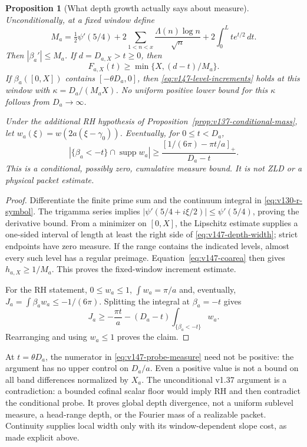\documentclass[11pt]{article}
\newtheorem{proposition}[theorem]{Proposition}
\theoremstyle{remark}
\begin{document}
\begin{proposition}[What depth growth actually says about measure]
\label{prop:v147-depth-measure}
Unconditionally, at a fixed window define
\[
 M_a=\tfrac12\psi'(5/4)
       +2\sum_{1<n<x}\frac{\Lambda(n)\log n}{\sqrt n}
       +2\int_0^L t e^{t/2}\,dt.
\]
Then $|\beta_a'|\le M_a$. If $d=D_{a,X}>t\ge0$, then
\begin{equation}\label{eq:v147-depth-width}
 F_{a,X}(t)\ge\min\{X,(d-t)/M_a\}.
\end{equation}
If $\beta_a([0,X])$ contains $[-\theta D_a,0]$, then
\eqref{eq:v147-level-increments} holds at this window with
$\kappa=D_a/(M_aX)$. No uniform positive lower bound for this
$\kappa$ follows from $D_a\to\infty$.

Under the additional RH hypothesis of
Proposition~\ref{prop:v137-conditional-mass}, let
$w_a(\xi)=w(2a(\xi-\gamma_0))$. Eventually, for $0\le t<D_a$,
\begin{equation}\label{eq:v147-probe-measure}
 |\{\beta_a<-t\}\cap\operatorname{supp}w_a|
 \ge\frac{[1/(6\pi)-\pi t/a]_+}{D_a-t}.
\end{equation}
This is a conditional, possibly zero, cumulative measure bound. It
is not ZLD or a physical packet estimate.
\end{proposition}
\begin{proof}
Differentiate the finite prime sum and the continuum integral in
\eqref{eq:v130-r-symbol}. The trigamma series implies
$|\psi'(5/4+i\xi/2)|\le\psi'(5/4)$, proving the derivative bound.
From a minimizer on $[0,X]$, the Lipschitz estimate supplies a
one-sided interval of length at least the right side of
\eqref{eq:v147-depth-width}; strict endpoints have zero measure.
If the range contains the indicated levels, almost every such level
has a regular preimage. Equation~\eqref{eq:v147-coarea} then gives
$h_{a,X}\ge1/M_a$. This proves the fixed-window increment estimate.

For the RH statement, $0\le w_a\le1$, $\int w_a=\pi/a$ and,
eventually, $J_a=\int\beta_aw_a\le-1/(6\pi)$. Splitting the
integral at $\beta_a=-t$ gives
\[
 J_a\ge-\frac{\pi t}{a}
        -(D_a-t)\int_{\{\beta_a<-t\}}w_a.
\]
Rearranging and using $w_a\le1$ proves the claim.
\end{proof}
At $t=\theta D_a$, the numerator in
\eqref{eq:v147-probe-measure} need not be positive: the argument has
no upper control on $D_a/a$. Even a positive value is not a bound on
all band differences normalized by $X_a$. The unconditional v1.37
argument is a contradiction: a bounded cofinal scalar floor would
imply RH and then contradict the conditional probe. It proves global
depth divergence, not a uniform sublevel measure, a head-range depth,
or the Fourier mass of a realizable packet. Continuity supplies local
width only with its window-dependent slope cost, as made explicit above.
\end{document}
